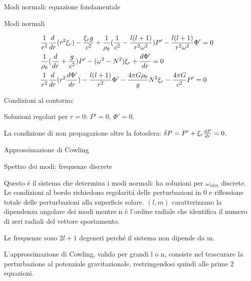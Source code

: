 \documentclass[10pt,xcolor={usenames},fleqn,mathserif,serif]{beamer}
\begin{document}
\begin{frame}{Modi normali: equazione fondamentale}

\begin{block}{Modi normali}

\begin{subequations}%
\begin{align*}
&\frac{1}{r^2}\TDof{r}(r^2\xi_r)-\frac{\xi_rg}{c^2}+\frac{1}{\rho_0}(\frac{1}{c^2}-\frac{l(l+1)}{r^2\omega^2})P'-\frac{l(l+1)}{r^2\omega^2}\Phi'=0\\
&\frac{1}{\rho_0}(\TDof{r}+\frac{g}{c^2})P'-(\omega^2-N^2)\xi_r+\TDy{r}{\Phi'}=0\\
&\frac{1}{r^2}\TDof{r}(r^2\TDy{r}{\Phi'})-\frac{l(l+1)}{r^2}\Phi'-\frac{4\pi G\rho_0}{g}N^2\xi_r-\frac{4\pi G}{c^2}P'=0
\end{align*}
\end{subequations}

Condizioni al contorno:

Soluzioni regolari per $r=0$: $P'=0$, $\Phi'=0$.

La condizione di non propagazione oltre la fotosfera: $\Lvar{P}=P'+\xi_r\TDy{r}{P}=0$.

\end{block}

\begin{block}{Approssimazione di Cowling}

\end{block}

\end{frame}

\begin{wordonframe}{Spettro dei modi: frequenze discrete}

Questo \'e il sistema che determina i modi normali: ha soluzioni per $\omega_{nlm}$ discrete. Le condizioni al bordo richiedono regolarit\'a delle perturbazioni in 0 e riflessione totale delle perturbazioni alla superficie solare. $(l,m)$ caratterizzano la dipendenza angolare dei modi mentre n \'e l'ordine radiale che identifica il numero di zeri radiali del vettore spostamento.

Le frequenze sono $2l+1$ degeneri perch\'e il sistema non dipende da m.

L'approssimazione di Cowling, valida per grandi l o n, consiste nel trascurare la perturbazione al potenziale gravitazionale, restringendosi quindi alle prime 2 equazioni.

\end{wordonframe}
\end{document}
